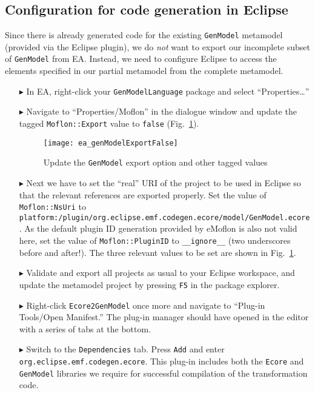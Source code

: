 \newpage

\subsection{Configuration for code generation in Eclipse}
\genHeader

Since there is already generated code for the existing \texttt{GenModel} metamodel (provided via the Eclipse plugin), we do \emph{not} want to export our
incomplete subset of \texttt{GenModel} from EA. Instead, we need to configure Eclipse to access the elements specified in our partial metamodel from the
complete metamodel.

\begin{enumerate}

\item[$\blacktriangleright$] In EA, right-click your \texttt{GenModelLanguage} package and select ``Properties\ldots'' 

\item[$\blacktriangleright$] Navigate to ``Properties/Moflon'' in the dialogue window and update the tagged \texttt{Moflon::Export} value to \texttt{false}
(Fig.~\ref{fig_customNS}).

\begin{figure}[htb]
\begin{center}  \texttt{[image: ea\_genModelExportFalse]}
  \caption{Update the \texttt{GenModel} export option and other tagged values}  
  \label{fig_customNS}
\end{center}
\end{figure}

\item[$\blacktriangleright$] Next we have to set the ``real'' URI of the project to be used in Eclipse so that the relevant references are exported
properly. Set the value of \texttt{Moflon::NsUri} to \texttt{platform:/\-plugin/\-org.\-eclipse.\-emf.codegen.ecore/\-model/\-GenModel.ecore}.
As the default plugin ID generation provided by eMoflon is also not valid here, set the value of \texttt{Moflon::PluginID} to \texttt{\_\_ignore\_\_} (two underscores before and after!).
The three relevant values to be set are shown in Fig.~\ref{fig_customNS}.

\item[$\blacktriangleright$] Validate and export all projects as usual to your Eclipse workspace, and update the metamodel project by pressing \texttt{F5} in
the package explorer.

\item[$\blacktriangleright$] Right-click \texttt{Ecore2GenModel} once more and navigate to ``Plug-in Tools/Open Manifest.'' The plug-in manager should have
opened in the editor with a series of tabs at the bottom.

\item[$\blacktriangleright$] Switch to the \texttt{Dependencies} tab. Press \texttt{Add} and enter \texttt{org.\-eclipse.\-emf.\-codegen.\-ecore}. This plug-in
includes both the \texttt{Ecore} and \texttt{Gen\-Mod\-el} libraries we require for successful compilation of the transformation code.

\end{enumerate}

